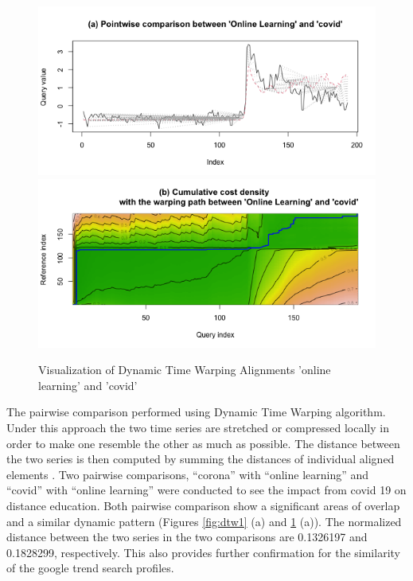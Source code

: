 \documentclass[11pt,a4paper,]{article}
\begin{document}
\begin{figure}[h]

{\centering \includegraphics[width=1\textwidth]{figure/dtw2-1} \includegraphics[width=1\textwidth]{figure/dtw2-2} 

}

\caption{Visualization of Dynamic Time Warping Alignments  'online learning' and 'covid'}\label{fig:dtw2}
\end{figure}

The pairwise comparison performed using Dynamic Time Warping algorithm. Under this approach the two time series are stretched or compressed locally in order to make one resemble the other as much as possible. The distance between the two series is then computed by summing the distances of individual aligned elements \autocite{giorgino2009computing}. Two pairwise comparisons, ``corona'' with ``online learning'' and ``covid'' with ``online learning'' were conducted to see the impact from covid 19 on distance education. Both pairwise comparison show a significant areas of overlap and a similar dynamic pattern (Figures \ref{fig:dtw1} (a) and \ref{fig:dtw2} (a)). The normalized distance between the two series in the two comparisons are 0.1326197 and 0.1828299, respectively. This also provides further confirmation for the similarity of the google trend search profiles.
\end{document}
